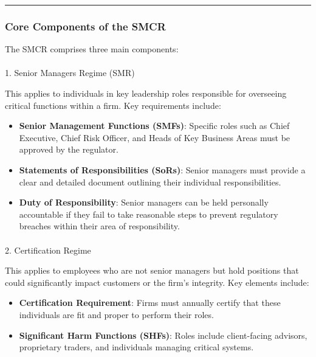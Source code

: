 \documentclass[
  a4paper,
]{article}
\makeatletter
\let\oldparagraph\paragraph
\renewcommand{\paragraph}{
    \@ifstar
      \xxxParagraphStar
      \xxxParagraphNoStar
  }
\newcommand{\xxxParagraphStar}[1]{\oldparagraph*{#1}\mbox{}}
\newcommand{\xxxParagraphNoStar}[1]{\oldparagraph{#1}\mbox{}}
\providecommand{\tightlist}{%
  \setlength{\itemsep}{0pt}\setlength{\parskip}{0pt}}\usepackage{longtable,booktabs,array}
\makeatother
\begin{document}
\begin{center}\rule{0.5\linewidth}{0.5pt}\end{center}

\subsubsection{Core Components of the
SMCR}\label{core-components-of-the-smcr}

The SMCR comprises three main components:

\paragraph{1. Senior Managers Regime
(SMR)}\label{senior-managers-regime-smr}

This applies to individuals in key leadership roles responsible for
overseeing critical functions within a firm. Key requirements include:

\begin{itemize}
\tightlist
\item
  \textbf{Senior Management Functions (SMFs)}: Specific roles such as
  Chief Executive, Chief Risk Officer, and Heads of Key Business Areas
  must be approved by the regulator.
\item
  \textbf{Statements of Responsibilities (SoRs)}: Senior managers must
  provide a clear and detailed document outlining their individual
  responsibilities.
\item
  \textbf{Duty of Responsibility}: Senior managers can be held
  personally accountable if they fail to take reasonable steps to
  prevent regulatory breaches within their area of responsibility.
\end{itemize}

\paragraph{2. Certification Regime}\label{certification-regime}

This applies to employees who are not senior managers but hold positions
that could significantly impact customers or the firm's integrity. Key
elements include:

\begin{itemize}
\tightlist
\item
  \textbf{Certification Requirement}: Firms must annually certify that
  these individuals are fit and proper to perform their roles.
\item
  \textbf{Significant Harm Functions (SHFs)}: Roles include
  client-facing advisors, proprietary traders, and individuals managing
  critical systems.
\end{itemize}
\end{document}
